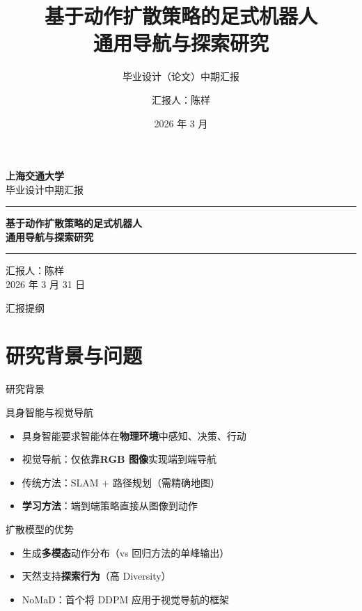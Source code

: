\documentclass[aspectratio=169,10pt]{beamer}
\title[中期汇报]{基于动作扩散策略的足式机器人\\通用导航与探索研究}
\subtitle{毕业设计（论文）中期汇报}
\author[陈样]{汇报人：陈样}
\institute[SJTU]{上海交通大学}
\date{2026 年 3 月}
\begin{document}
{
\begin{frame}
\begin{center}
\vspace{5mm}
{\Large\bfseries 上海交通大学}\\[3mm]
{\large 毕业设计中期汇报}\\[8mm]
\hrule
\vspace{5mm}
{\LARGE\bfseries\color{sjtuBlue} 基于动作扩散策略的足式机器人\\[2mm]通用导航与探索研究}\\[5mm]
\hrule
\vspace{6mm}
{\large 汇报人：陈样}\\[2mm]
{\normalsize 2026 年 3 月 31 日}
\end{center}
\end{frame}
}

\begin{frame}{汇报提纲}
\tableofcontents
\end{frame}

\section{研究背景与问题}

\begin{frame}{研究背景}
\begin{block}{具身智能与视觉导航}
\begin{itemize}
\item 具身智能要求智能体在\textbf{物理环境}中感知、决策、行动
\item 视觉导航：仅依靠\textbf{RGB 图像}实现端到端导航
\item 传统方法：SLAM + 路径规划（需精确地图）
\item \textbf{学习方法}：端到端策略直接从图像到动作
\end{itemize}
\end{block}
\pause
\begin{alertblock}{扩散模型的优势}
\begin{itemize}
\item 生成\textbf{多模态}动作分布（vs 回归方法的单峰输出）
\item 天然支持\textbf{探索行为}（高 Diversity）
\item NoMaD：首个将 DDPM 应用于视觉导航的框架
\end{itemize}
\end{alertblock}
\end{frame}
\end{document}
